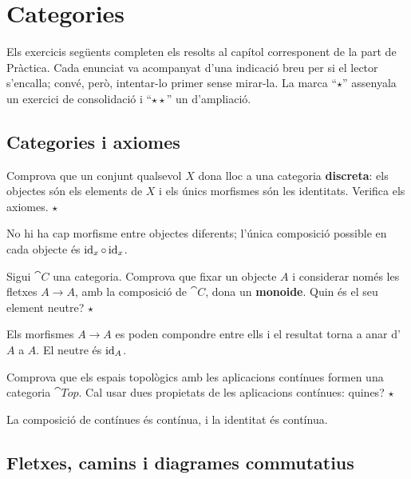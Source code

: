 \chapter{Categories}

Els exercicis següents completen els resolts al capítol corresponent de la part de Pràctica. Cada enunciat va acompanyat d'una indicació breu per si el lector s'encalla; convé, però, intentar-lo primer sense mirar-la. La marca \enquote{$\star$} assenyala un exercici de consolidació i \enquote{$\star\star$} un d'ampliació.

\section{Categories i axiomes}

\begin{exercici}
Comprova que un conjunt qualsevol $X$ dona lloc a una categoria \textbf{discreta}: els objectes són els elements de $X$ i els únics morfismes són les identitats. Verifica els axiomes. \hfill{\normalfont$\star$}
\begin{indicacio}
No hi ha cap morfisme entre objectes diferents; l'única composició possible en cada objecte és $\operatorname{id}_x\circ\operatorname{id}_x$.
\end{indicacio}
\end{exercici}

\begin{exercici}
Sigui $\cat{C}$ una categoria. Comprova que fixar un objecte $A$ i considerar només les fletxes $A\to A$, amb la composició de $\cat{C}$, dona un \textbf{monoide}. Quin és el seu element neutre? \hfill{\normalfont$\star$}
\begin{indicacio}
Els morfismes $A\to A$ es poden compondre entre ells i el resultat torna a anar d'$A$ a $A$. El neutre és $\operatorname{id}_A$.
\end{indicacio}
\end{exercici}

\begin{exercici}
Comprova que els espais topològics amb les aplicacions contínues formen una categoria $\cat{Top}$. Cal usar dues propietats de les aplicacions contínues: quines? \hfill{\normalfont$\star$}
\begin{indicacio}
La composició de contínues és contínua, i la identitat és contínua.
\end{indicacio}
\end{exercici}

\section{Fletxes, camins i diagrames commutatius}

